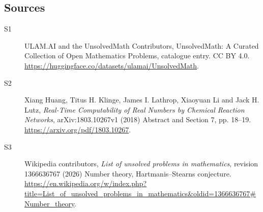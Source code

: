 \documentclass[11pt]{article}
\begin{document}
\subsection{Sources}
\begin{description}
\item[\hypertarget{source:statement:1}{S1}] ULAM.AI and the UnsolvedMath Contributors, UnsolvedMath: A Curated Collection of Open Mathematics Problems, catalogue entry. CC BY 4.0. \url{https://huggingface.co/datasets/ulamai/UnsolvedMath}.
\item[\hypertarget{source:statement:2}{S2}] Xiang Huang, Titus H. Klinge, James I. Lathrop, Xiaoyuan Li and Jack H. Lutz, \emph{Real-Time Computability of Real Numbers by Chemical Reaction Networks}, arXiv:1803.10267v1 (2018) Abstract and Section 7, pp. 18--19. \url{https://arxiv.org/pdf/1803.10267}.
\item[\hypertarget{source:statement:3}{S3}] Wikipedia contributors, \emph{List of unsolved problems in mathematics}, revision 1366636767 (2026) Number theory, Hartmanis–Stearns conjecture. \url{https://en.wikipedia.org/w/index.php?title=List_of_unsolved_problems_in_mathematics&oldid=1366636767#Number_theory}.
\end{description}
\label{end:statement}
\end{document}
